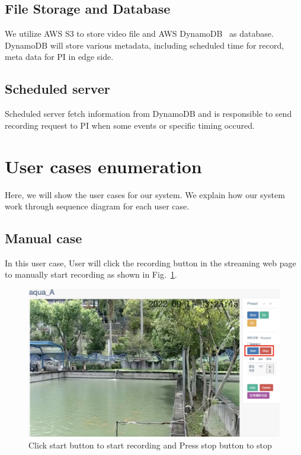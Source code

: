 \subsection{File Storage and Database}
We utilize AWS S3 to store video file and AWS DynamoDB~\cite{aws-dynamodb} as database. DynamoDB will store various metadata, including scheduled time for record, meta data for PI in edge side.

\subsection{Scheduled server}
Scheduled server fetch information from DynamoDB and is responsible to send recording request to PI when some events or specific timing occured. 


\section{User cases enumeration}
Here, we will show the user cases for our system. We explain how our system work through sequence diagram for each user case.
\subsection{Manual case}
In this user case, User will click the recording button in the streaming web page to manually start recording as shown in Fig.~\ref{fig:manual-case}. 


\begin{figure}[H]
    \centering
    \includegraphics[width=\textwidth]{figsrc/manual-case.png}
    \caption{Click start button to start recording and Press stop button to stop\label{fig:manual-case}}
\end{figure}

